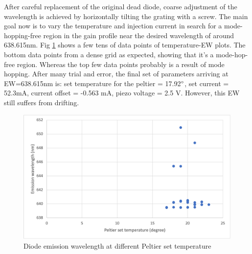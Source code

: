 \documentclass[12pt]{report}
\begin{document}
After careful replacement of the original dead diode, coarse adjustment of the wavelength is achieved by horizontally tilting the grating with a screw. The main goal now is to vary the temperature and injection current in search for a mode-hopping-free region in the gain profile near the desired wavelength of around 638.615nm. Fig \ref{fig:diodeLaserEW} shows a few tens of data points of temperature-EW plots. The bottom data points from a dense grid as expected, showing that it's a mode-hop-free region. Whereas the top few data points probably is a result of mode hopping. After many trial and error, the final set of parameters arriving at EW=638.615nm is: set temperature for the peltier = 17.92$\degree$, set current = 52.3mA, current offset = -0.563 mA, piezo voltage = 2.5 V. However, this EW still suffers from drifting. 

\begin{figure}[H]
    \centering
    \includegraphics{diodeLaserEW.png}
    \caption{Diode emission wavelength at different Peltier set temperature}
    \label{fig:diodeLaserEW}
\end{figure}
\end{document}
